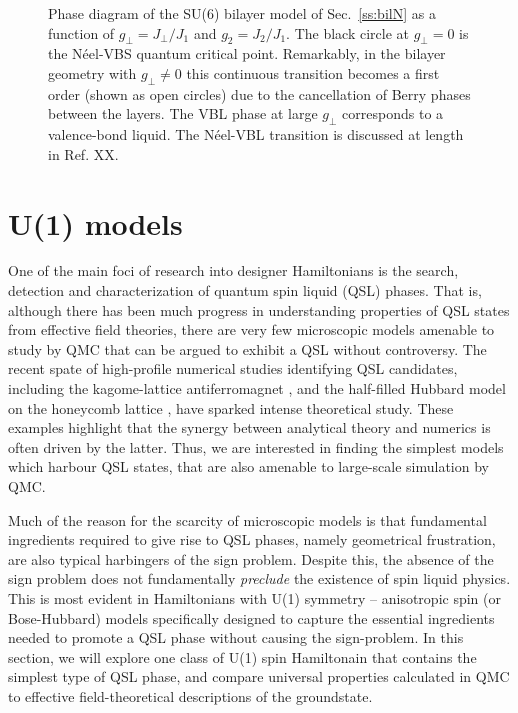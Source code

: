 \documentclass[range]{ar2e}
\begin{document}
\begin{figure}
\centerline{}
  \caption{ \label{fig:pd_bil} Phase diagram of the
    SU($6$) bilayer model of Sec.~\ref{ss:bilN} as a function of $g_\perp =J_\perp/J_1$ and $g_2=J_2/J_1$. The black circle at $g_\perp=0$ is the N\'eel-VBS quantum critical point. Remarkably, in the bilayer geometry with $g_\perp\neq 0$ this continuous transition becomes a first order (shown as open circles) due to the cancellation of Berry phases between the layers. The VBL phase at large $g_\perp$ corresponds to a valence-bond liquid. The N\'eel-VBL transition is discussed at length in Ref. XX.}
\end{figure}

\section{U(1) models}
\label{sec:u1models}

One of the main foci of research into designer Hamiltonians is the search, detection and characterization of quantum spin liquid (QSL) phases.  
That is, although there has been much progress in understanding properties of QSL states from effective field theories, there are very few microscopic models amenable to study by QMC that can be argued to exhibit a QSL without controversy.
The recent spate of high-profile numerical studies identifying QSL candidates, including the kagome-lattice antiferromagnet \cite{Yan}, and the half-filled Hubbard model on the honeycomb lattice \cite{Meng}, have sparked intense theoretical study.   
These examples highlight that the synergy between analytical theory and numerics is often driven by the latter.  Thus, we are interested in finding the simplest models which harbour QSL states, that are also amenable to large-scale simulation by QMC.

Much of the reason for the scarcity of microscopic models is that fundamental ingredients required to give rise to QSL phases, namely geometrical frustration, are also typical harbingers of the sign problem.  Despite this, the absence of the sign problem does not fundamentally {\it preclude} the existence of spin liquid physics.  This is most evident in Hamiltonians with U(1) symmetry -- anisotropic spin (or Bose-Hubbard) models specifically designed to capture the essential ingredients needed to promote a QSL phase without causing the sign-problem.  In this section, we will explore one class of U(1) spin Hamiltonain that contains the simplest type of QSL phase, and compare universal properties calculated in QMC to effective field-theoretical descriptions of the groundstate.
\end{document}

